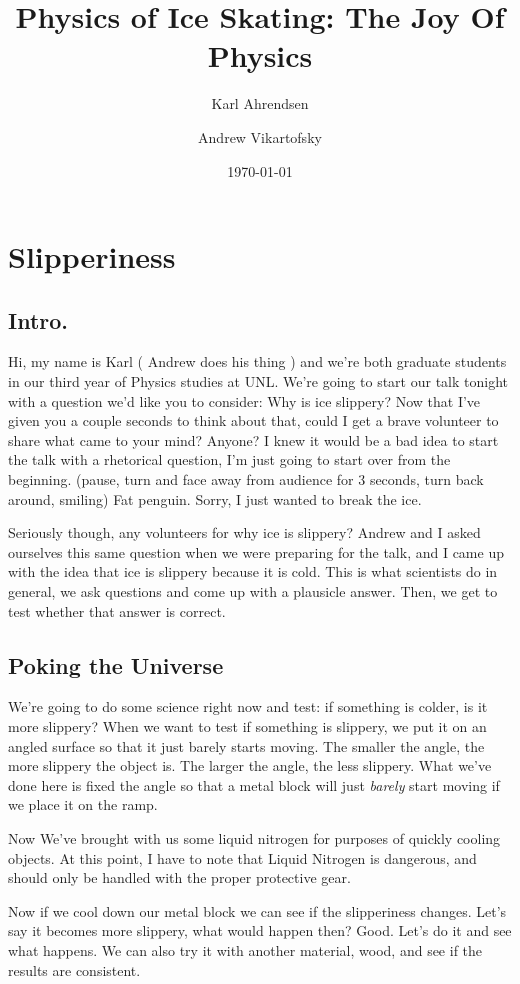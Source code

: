 \documentclass[12pt]{article}
\title{Physics of Ice Skating: The Joy Of Physics}
\author{Karl Ahrendsen \and Andrew Vikartofsky}
\date{\today}
\begin{document}
\maketitle
\section{Slipperiness}
\subsection{Intro.}
Hi, my name is Karl ( Andrew does his thing ) and we're both graduate
students in our third year of Physics studies at UNL. 
We're going to start our talk tonight with a question we'd like you to consider:
Why is ice slippery? Now that I've given you a couple seconds to think about that, 
could I get a brave volunteer to share what came to your mind? Anyone? I knew it would
be a bad idea to start the talk with a rhetorical question, I'm just going to start 
over from the beginning. (pause, turn and face away from audience for 3 seconds, 
turn back around, smiling) Fat penguin. Sorry, I just wanted to break the ice. 
    
Seriously
though, any volunteers for why ice is slippery? Andrew and I asked ourselves
this same question when we were preparing for the talk, and I came up with the
idea that ice is slippery because it is cold. 
This is what scientists do in general, we ask questions and come up with a 
plausicle answer. Then, we get to test whether that answer is correct. 

\subsection{Poking the Universe}
We're going to do some science right now 
and test: if something is colder, is it more slippery? When we want to test 
if something is slippery, we put it on an angled surface so that it just barely 
starts moving. The smaller the angle, the more slippery the object is. The 
larger the angle, the less slippery. 
What we've done here is fixed the angle so that a metal block will just \emph{barely}
start moving if we place it on the ramp. 

Now We've brought with us some 
liquid nitrogen for purposes of quickly cooling objects. 
At this point, I have to note that Liquid Nitrogen is 
dangerous, and should only be handled with the proper protective gear. 

Now if we cool down our metal block
we can see if the slipperiness changes. Let's say it becomes more slippery, what 
would happen then? Good. Let's do it and see what happens. 
We can also try it with another material, wood, and see if the results are 
consistent.
\end{document}
